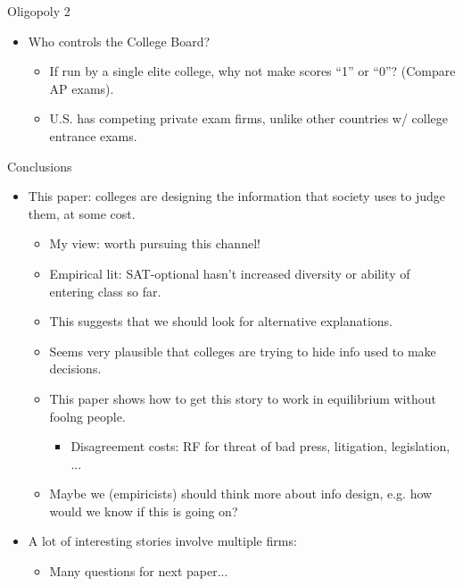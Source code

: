 \documentclass[11pt, aspectratio=169]{beamer}
\theoremstyle{plain}
\theoremstyle{plain}
\theoremstyle{plain}
\theoremstyle{plain}
\begin{document}
\begin{frame}{Oligopoly 2}
\begin{itemize}
    \item Who controls the College Board? \pause
    \begin{itemize}
        \item If run by a single elite college, why not make scores ``1'' or ``0''?  (Compare AP exams). \pause
        \item U.S. has competing private exam firms, unlike other countries w/ college entrance exams.
    \end{itemize}
\end{itemize}
\end{frame}

\begin{frame}{Conclusions}
    \begin{itemize}
        \item This paper: colleges are designing the information that society uses to judge them, at some cost.
        \begin{itemize}
            \item My view: worth pursuing this channel!
            \item Empirical lit: SAT-optional hasn't increased diversity or ability of entering class so far.
            \item This suggests that we should look for alternative explanations.  
            \item Seems very plausible that colleges are trying to hide info used to make decisions.
            \item This paper shows how to get this story to work in equilibrium without foolng people.
            \begin{itemize}
                \item Disagreement costs: RF for threat of bad press, litigation, legislation, ...
            \end{itemize}
            \item Maybe we (empiricists) should think more about info design, e.g. how would we know if this is going on?
        \end{itemize}
        \item A lot of interesting stories involve multiple firms:
        \begin{itemize}
            \item Many questions for next paper...
        \end{itemize}
    \end{itemize}
\end{frame}
\end{document}
